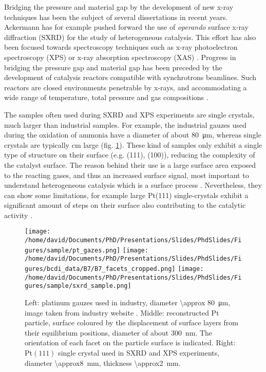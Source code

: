 Bridging the pressure and material gap by the development of new x-ray techniques has been the subject of several dissertations in recent years.
Ackermann \parencite*{Ackermann2007} has for example pushed forward the use of \textit{operando} surface x-ray diffraction (SXRD) for the study of heterogeneous catalysis.
This effort has also been focused towards spectroscopy techniques such as x-ray photoelectron spectroscopy (XPS) or x-ray absorption spectroscopy (XAS) \parencite{Dann2019}.
Progress in bridging the pressure gap and material gap has been preceded by the development of catalysis reactors compatible with synchrotrons beamlines.
Such reactors are closed environments penetrable by x-rays, and accommodating a wide range of temperature, total pressure and gas compositions \parencite{VanRijn2010, Richard2017, CastanGuerrero2018}.

The samples often used during SXRD and XPS experiments are single crystals, much larger than industrial samples.
For example, the industrial gauzes used during the oxidation of ammonia have a diameter of about \qty{80}{\um}, whereas single crystals are typically \unit{\cm} large (fig. \ref{fig:SamplesIntro}).
These kind of samples only exhibit a single type of structure on their surface (e.g. (111), (100)), reducing the complexity of the catalyst surface.
The reason behind their use is a large surface area exposed to the reacting gases, and thus an increased surface signal, most important to understand heterogeneous catalysis which is a surface process \parencite{Goodman1994}.
Nevertheless, they can show some limitations, for example large Pt(111) single-crystals exhibit a significant amount of steps on their surface also contributing to the catalytic activity \parencite{CalleVallejo2017}.

\begin{figure}[!htb]
    \centering
    \texttt{[image: /home/david/Documents/PhD/Presentations/Slides/PhdSlides/Figures/sample/pt\_gazes.png]}
    \texttt{[image: /home/david/Documents/PhD/Presentations/Slides/PhdSlides/Figures/bcdi\_data/B7/B7\_facets\_cropped.png]}
    \texttt{[image: /home/david/Documents/PhD/Presentations/Slides/PhdSlides/Figures/sample/sxrd\_sample.png]}
    \caption{
    Left: platinum gauzes used in industry, diameter \qty{\approx 80}{\um}, image taken from industry website \parencite{PtRhGauze}.
    Middle: reconstructed Pt particle, surface coloured by the displacement of surface layers from their equilibrium positions, diameter of about \qty{300}{\nm}.
    The orientation of each facet on the particle surface is indicated.
    Right: Pt$(111)$ single crystal used in SXRD and XPS experiments, diameter \qty{\approx8}{\mm}, thickness \qty{\approx2}{\mm}.
    }
    \label{fig:SamplesIntro}
\end{figure}


